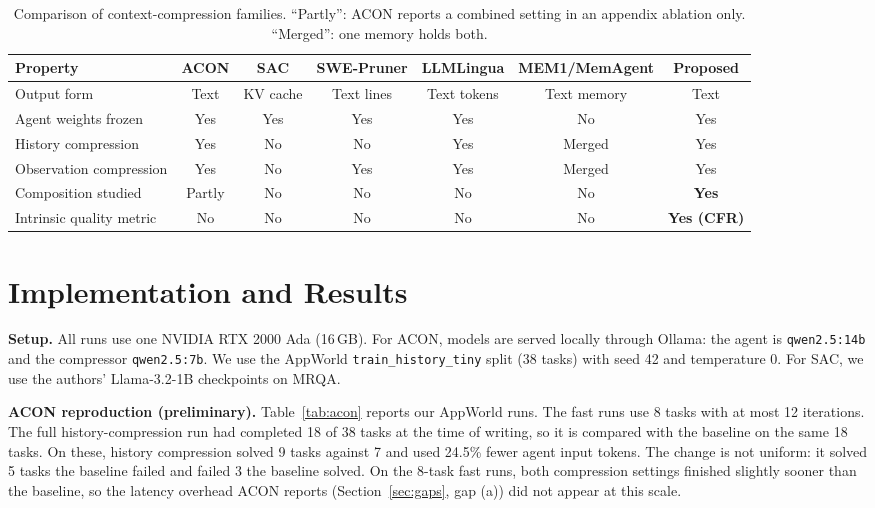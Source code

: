 \documentclass[10pt,a4paper]{article}
\begin{document}
\begin{table}[h]
\centering
\scriptsize
\renewcommand{\arraystretch}{1.12}
\setlength{\tabcolsep}{3pt}
\begin{tabular}{p{}cccccc}
\toprule
\textbf{Property} & \textbf{ACON} & \textbf{SAC} & \textbf{SWE-Pruner} &
\textbf{LLMLingua} & \textbf{MEM1/MemAgent} & \textbf{Proposed}\\
\midrule
Output form & Text & KV cache & Text lines & Text tokens & Text memory & Text\\
Agent weights frozen & Yes & Yes & Yes & Yes & No & Yes\\
History compression & Yes & No & No & Yes & Merged & Yes\\
Observation compression & Yes & No & Yes & Yes & Merged & Yes\\
Composition studied & Partly & No & No & No & No & \textbf{Yes}\\
Intrinsic quality metric & No & No & No & No & No & \textbf{Yes (CFR)}\\
\bottomrule
\end{tabular}
\caption{Comparison of context-compression families. ``Partly'': ACON reports a
combined setting in an appendix ablation only. ``Merged'': one memory holds both.}
\label{tab:lit}
\end{table}

\section{Implementation and Results}

\textbf{Setup.} All runs use one NVIDIA RTX 2000 Ada (16\,GB). For ACON,
models are served locally through Ollama: the agent is \texttt{qwen2.5:14b}
and the compressor \texttt{qwen2.5:7b}. We use the AppWorld
\texttt{train\_history\_tiny} split (38 tasks) with seed 42 and temperature 0.
For SAC, we use the authors' Llama-3.2-1B checkpoints on MRQA.

\textbf{ACON reproduction (preliminary).} Table~\ref{tab:acon} reports our
AppWorld runs. The fast runs use 8 tasks with at most 12 iterations. The full
history-compression run had completed 18 of 38 tasks at the time of writing,
so it is compared with the baseline on the same 18 tasks. On these, history
compression solved 9 tasks against 7 and used 24.5\% fewer agent input tokens.
The change is not uniform: it solved 5 tasks the baseline failed and failed 3
the baseline solved. On the 8-task fast runs, both compression settings
finished slightly sooner than the baseline, so the latency overhead ACON
reports (Section~\ref{sec:gaps}, gap (a)) did not appear at this scale.
\end{document}
